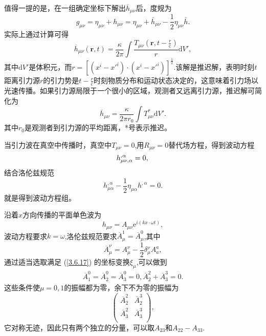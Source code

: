 \documentclass[11pt, a4paper, oneside, onecolumn]{ctexart}
\numberwithin{equation}{subsection}
\begin{document}
值得一提的是，在一组确定坐标下解出$\overline{h}_{\mu\nu}$后，度规为
\begin{equation}
g_{\mu\nu}=\eta_{\mu\nu}+h_{\mu\nu}=\eta_{\mu\nu}+\overline{h}_{\mu\nu}-\frac12\eta_{\mu\nu}\overline{h}.
\end{equation}
实际上通过计算可得
\begin{equation}
\overline{h}_{\mu\nu}\left(\boldsymbol{r},t\right)=\frac{\kappa}{2\pi}\int\frac{T_{\mu\nu}\left(\boldsymbol{r},t-\frac{r}{\mathrm{c}}\right)}{r}\mathrm{d}V',
\end{equation}
其中$\mathrm{d}V'$是体积元，而$r=\left[\left(x^{i}-x'^{i}\right)\cdot\left(x^{i}-x'^{i}\right)\right]^{\frac12}$.该解是推迟解，表明时刻$t$距离引力源$r$的引力势是$t-\frac{r}{\mathrm{c}}$时刻物质分布和运动状态决定的，这意味着引力场以光速传播。如果引力源局限于一个很小的区域，观测者又远离引力源，推迟解可简化为
\begin{equation}
\overline{h}_{\mu\nu}=\frac{\kappa}{2\pi r_{0}}\int T_{\mu\nu}^{*}\mathrm{d}V'.
\end{equation}
其中$r_{0}$是观测者到引力源的平均距离，*号表示推迟。

当引力波在真空中传播时，真空中$T_{\mu\nu}=0$,用$R_{\mu\nu}=0$替代场方程，得到波动方程
\begin{equation}
h^{,\alpha}_{\mu\nu,\alpha}=0,\\
\end{equation}
结合洛伦兹规范
\begin{equation}
h^{,\alpha}_{\mu\alpha}-\frac{1}{2}\eta_{\mu\alpha}h^{,\alpha}=0.
\end{equation}
就是得到波动方程组。

沿着$x$方向传播的平面单色波为
\begin{equation}
h_{\mu\nu}=A_{\mu\nu}\mathrm{e}^{i\left(kx\cdot\omega t\right)},
\end{equation}
波动方程要求$k=\omega$,洛伦兹规范要求$\overline{A}^{1}_{\mu}=\overline{A}^{0}_{\mu}$,其中
\begin{equation}
\overline{A}^{\nu}_{\mu}=A^{\nu}_{\mu}-\frac{1}{2}\delta{}^{\nu}_{\mu}A^{a}_{a},
\end{equation}
通过适当选取满足 (\ref{3.6.17}) 的坐标变换$\xi_{\mu}$,可以做到
\begin{align}
\overline{A}^{0}_{1}=\overline{A}^{0}_{2}=\overline{A}^{0}_{3}=0,\overline{A}^{2}_{2}+\overline{A}^{3}_{3}=0.
\end{align}
这些条件使$\mu=0,1$的振幅都为零，余下不为零的振幅为
\begin{equation}
\begin{pmatrix}
\overline{A}^{2}_{2} & \overline{A}^{3}_{2}\\
\overline{A}^{2}_{3} & \overline{A}^{3}_{3}\\
\end{pmatrix},
\end{equation}
它对称无迹，因此只有两个独立的分量，可以取$A_{23}$和$A_{22}-A_{33}$.
\end{document}
